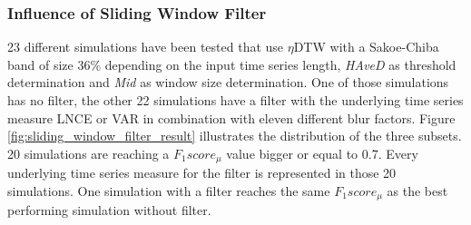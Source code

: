 \subsubsection{Influence of Sliding Window Filter} \label{influence_of_sliding_window_filter}
23 different simulations have been tested that use $\eta$DTW with a Sakoe-Chiba band of size 36\% depending on the input
time series length, \textit{HAveD} as threshold determination and \textit{Mid} as window size determination. One of
those simulations has no filter, the other 22 simulations have a filter with the underlying time series measure LNCE or
VAR in combination with eleven different blur factors. Figure \ref{fig:sliding_window_filter_result} illustrates the
distribution of the three subsets. 20 simulations are reaching a $F_{1}score_{\mu}$ value bigger or equal to 0.7. Every
underlying time series measure for the filter is represented in those 20 simulations. One simulation with a filter
reaches the same $F_{1}score_{\mu}$ as the best performing simulation without filter.

